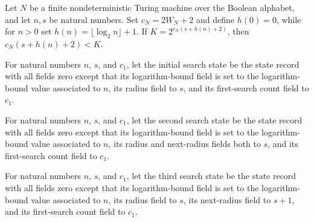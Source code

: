 \begin{lemma}
\label{Complexity.LogProg.ExpBFS.lt_kb}
\leanok
{}
Let $N$ be a finite nondeterministic Turing machine over the Boolean alphabet, and let
$n,s$ be natural numbers. Set $c_N=2W_N+2$ and define $h(0)=0$, while for $n>0$ set
$h(n)=\lfloor\log_2 n\rfloor+1$. If $K=2^{c_N(s+h(n)+2)}$, then
$c_N(s+h(n)+2)<K$.
\end{lemma}

\begin{definition}
\label{Complexity.LogProg.ExpBFS.st1}
\leanok
{}
For natural numbers $n$, $s$, and $c_1$, let the initial search state be the state
record with all fields zero except that its logarithm-bound field is set to the
logarithm-bound value associated to $n$, its radius field to $s$, and its first-search
count field to $c_1$.
\end{definition}

\begin{definition}
\label{Complexity.LogProg.ExpBFS.st2}
\leanok
{}
For natural numbers $n$, $s$, and $c_1$, let the second search state be the state record
with all fields zero except that its logarithm-bound field is set to the logarithm-bound
value associated to $n$, its radius and next-radius fields both to $s$, and its
first-search count field to $c_1$.
\end{definition}

\begin{definition}
\label{Complexity.LogProg.ExpBFS.st3}
\leanok
{}
For natural numbers $n$, $s$, and $c_1$, let the third search state be the state record
with all fields zero except that its logarithm-bound field is set to the logarithm-bound
value associated to $n$, its radius field to $s$, its next-radius field to $s+1$, and
its first-search count field to $c_1$.
\end{definition}


